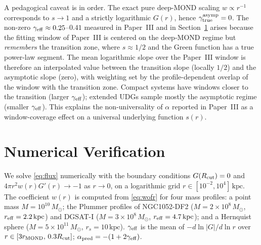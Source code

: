 \documentclass[aps,prd,twocolumn,superscriptaddress,nofootinbib]{revtex4-2}
\begin{document}
A pedagogical caveat is in order. The exact pure deep-MOND scaling
$w\propto r^{-1}$ corresponds to $s\to 1$ and a strictly
logarithmic $G(r)$, hence $\gamma_{\rm true}^{\rm asymp} = 0$. The
non-zero $\gamma_{\rm eff}\approx 0.25$--$0.41$ measured in
Paper~III and in Section~\ref{sec:numerical} arises because the
fitting window of Paper~III is centered on the deep-MOND regime but
\emph{remembers} the transition zone, where $s\approx 1/2$ and the
Green function has a true power-law segment. The mean logarithmic
slope over the Paper~III window is therefore an interpolated value
between the transition slope (locally $1/2$) and the asymptotic
slope (zero), with weighting set by the profile-dependent
overlap of the window with the transition zone. Compact systems
have windows closer to the transition (larger $\gamma_{\rm eff}$);
extended UDGs sample mostly the asymptotic regime (smaller
$\gamma_{\rm eff}$). This explains the non-universality of $\alpha$
reported in Paper~III as a window-coverage effect on a universal
underlying function $s(r)$.

\section{Numerical Verification}\label{sec:numerical}

We solve \eqref{eq:flux} numerically with the boundary conditions
$G(R_{\rm cut}) = 0$ and $4\pi r^2 w(r) G'(r)\to -1$ as $r\to 0$,
on a logarithmic grid $r\in[10^{-2},10^4]\,\mathrm{kpc}$. The
coefficient $w(r)$ is computed from \eqref{eq:wofr} for four mass
profiles: a point mass $M = 10^{10}\,M_\odot$; the Plummer profiles
of NGC1052-DF2 ($M=2\times10^8\,M_\odot$, $r_{\rm eff}=2.2\,
\mathrm{kpc}$) and DGSAT-I ($M=3\times10^8\,M_\odot$,
$r_{\rm eff}=4.7\,\mathrm{kpc}$); and a Hernquist sphere
($M = 5\times10^{11}\,M_\odot$, $r_s = 10\,\mathrm{kpc}$).
$\gamma_{\rm eff}$ is the mean of $-d\ln|G|/d\ln r$ over
$r\in[3r_{\rm MOND},\,0.3 R_{\rm cut}]$; $\alpha_{\rm pred} =
-(1+2\gamma_{\rm eff})$.
\end{document}
